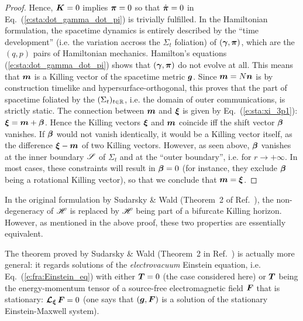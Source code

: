\begin{proof}
Hence, $\bm{K} = 0$ implies $\bm{\pi} = 0$ so that $\dot{\bm{\pi}} = 0$ in
Eq.~(\ref{e:sta:dot_gamma_dot_pi}) is trivially fulfilled. In the Hamiltonian formulation,
the spacetime dynamics is entirely described by the ``time development'' (i.e. the variation
accross the $\Sigma_t$ foliation) of
$(\bm{\gamma}, \bm{\pi})$, which are the $(q,p)$ pairs of Hamiltonian mechanics. Hamilton's equations (\ref{e:sta:dot_gamma_dot_pi}) shows that $(\bm{\gamma}, \bm{\pi})$ do not evolve at all.
This means that $\bm{m}$ is a Killing vector of the spacetime metric
$\bm{g}$. Since $\bm{m} = N \bm{n}$ is by construction timelike and hypersurface-orthogonal,
this proves that the part of spacetime foliated by the $(\Sigma_t)_{t\in\mathbb{R}}$,
i.e. the domain of outer communications, is strictly static. The connection
between $\bm{m}$ and $\bm{\xi}$ is given by
Eq.~(\ref{e:sta:xi_3p1}): $\bm{\xi} = \bm{m} + \bm{\beta}$. Hence the Killing vectors
$\bm{\xi}$ and $\bm{m}$ coincide iff the shift vector $\bm{\beta}$ vanishes.
If $\bm{\beta}$ would not vanish identically, it would be a Killing vector itself,
as the difference $\bm{\xi} - \bm{m}$ of two Killing vectors.
However, as seen above,
$\bm{\beta}$ vanishes at the inner boundary $\mathscr{S}$ of $\Sigma_t$
and at the ``outer boundary'', i.e. for $r\to +\infty$.
In most cases, these constraints will result in $\bm{\beta} = 0$ (for instance, they
exclude $\bm{\beta}$ being a rotational Killing vector), so that we conclude
that $\bm{m} = \bm{\xi}$.
\end{proof}


\begin{remark}
In the original formulation by Sudarsky \& Wald (Theorem~2 of Ref.~\cite{SudarW93}), the non-degeneracy of $\mathscr{H}$
is replaced by $\mathscr{H}$ being part of a bifurcate Killing horizon.
However, as mentioned in the above proof, these two properties are essentially equivalent.
\end{remark}


\begin{remark}
The theorem proved by Sudarsky \& Wald (Theorem~2 in Ref.~\cite{SudarW93})
is actually more general: it regards solutions of the
\emph{electrovacuum} Einstein equation,
i.e. Eq.~(\ref{e:fra:Einstein_eq}) with either $\bm{T} = 0$ (the case considered here)
or $\bm{T}$ being the energy-momentum tensor of a source-free electromagnetic
field $\bm{F}$ that is stationary: $\bm{\mathcal{L}}_{\bm{\bm{\xi}}}\, \bm{F} = 0$ (one says that
$(\bm{g},\bm{F})$ is a solution of the stationary Einstein-Maxwell system).
\end{remark}

